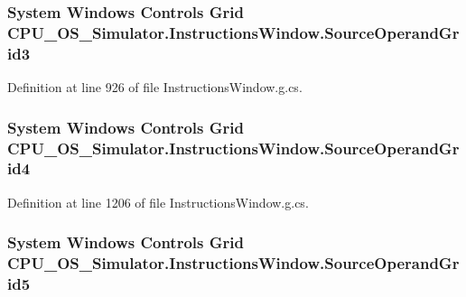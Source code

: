 \subsubsection[{Source\+Operand\+Grid3}]{\setlength{\rightskip}{0pt plus 5cm}System Windows Controls Grid C\+P\+U\+\_\+\+O\+S\+\_\+\+Simulator.\+Instructions\+Window.\+Source\+Operand\+Grid3\hspace{0.3cm}{\ttfamily [package]}}\label{class_c_p_u___o_s___simulator_1_1_instructions_window_ab8409532df6419d7f7ce0c3450807906}


Definition at line 926 of file Instructions\+Window.\+g.\+cs.

\hypertarget{class_c_p_u___o_s___simulator_1_1_instructions_window_ac28180235c174caa7a2870120a9258bb}{}
\subsubsection[{Source\+Operand\+Grid4}]{\setlength{\rightskip}{0pt plus 5cm}System Windows Controls Grid C\+P\+U\+\_\+\+O\+S\+\_\+\+Simulator.\+Instructions\+Window.\+Source\+Operand\+Grid4\hspace{0.3cm}{\ttfamily [package]}}\label{class_c_p_u___o_s___simulator_1_1_instructions_window_ac28180235c174caa7a2870120a9258bb}


Definition at line 1206 of file Instructions\+Window.\+g.\+cs.

\hypertarget{class_c_p_u___o_s___simulator_1_1_instructions_window_a3066f4664c81bacc6decdf84d08e74a9}{}
\subsubsection[{Source\+Operand\+Grid5}]{\setlength{\rightskip}{0pt plus 5cm}System Windows Controls Grid C\+P\+U\+\_\+\+O\+S\+\_\+\+Simulator.\+Instructions\+Window.\+Source\+Operand\+Grid5\hspace{0.3cm}{\ttfamily [package]}}\label{class_c_p_u___o_s___simulator_1_1_instructions_window_a3066f4664c81bacc6decdf84d08e74a9}


